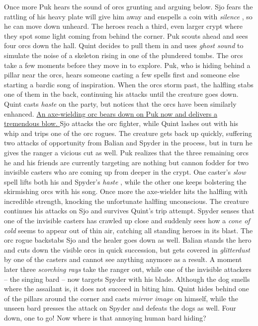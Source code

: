 Once more Puk hears the sound of orcs grunting and arguing below. Sjo fears the rattling of his heavy plate will give him away and enspells a coin with {\itshape silence} , so he can move down unheard. The heroes reach a third, even larger crypt where they spot some light coming from behind the corner. Puk scouts ahead and sees four orcs down the hall. Quint decides to pull them in and uses  {\itshape ghost sound} to simulate the noise of a skeleton rising in one of the plundered tombs. The orcs take a few moments before they move in to explore. Puk, who is hiding behind a pillar near the orcs, hears someone casting a few spells first and someone else starting a bardic song of inspiration. When the orcs storm past, the halfling stabs one of them in the back, continuing his attacks until the creature goes down. Quint casts  {\itshape haste} on the party, but notices that the orcs have been similarly enhanced. \hyperref[fig:Urgir-tomb-Level-3-594713616]{ An axe-wielding orc bears down on Puk now and delivers a tremendous blow. } Sjo attacks the orc fighter, while Quint lashes out with his whip and trips one of the orc rogues. The creature gets back up quickly, suffering two attacks of opportunity from Balian and Spyder in the process, but in turn he gives the ranger a vicious cut as well. Puk realizes that the three remaining orcs he and his friends are currently targeting are nothing but cannon fodder for two invisible casters who are coming up from deeper in the crypt. One caster's  {\itshape slow} spell lifts both his and Spyder's  {\itshape haste} , while the other one keeps bolstering the skirmishing orcs with his song. Once more the axe-wielder hits the halfling with incredible strength, knocking the unfortunate halfling unconscious. The creature continues his attacks on Sjo and survives Quint's trip attempt. Spyder senses that one of the invisible casters has crawled up close and suddenly sees how a  {\itshape cone of cold} seems to appear out of thin air, catching all standing heroes in its blast. The orc rogue backstabs Sjo and the healer goes down as well. Balian stands the hero and cuts down the visible orcs in quick succession, but gets covered in  {\itshape glitterdust} by one of the casters and cannot see anything anymore as a result. A moment later three  {\itshape scorching rays} take the ranger out, while one of the invisible attackers -- the singing bard -- now targets Spyder with his blade. Although the dog smells where the assailant is, it does not succeed in biting him. Quint hides behind one of the pillars around the corner and casts  {\itshape mirror image} on himself, while the unseen bard presses the attack on Spyder and defeats the dogs as well. Four down, one to go! Now where is that annoying human bard hiding? \\

